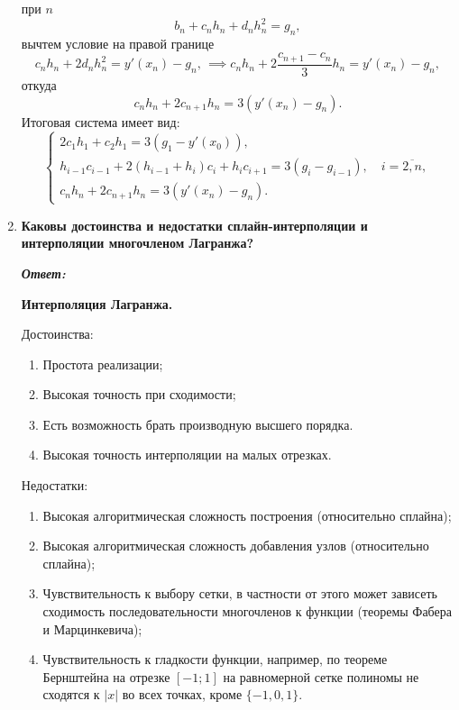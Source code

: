 \documentclass[12pt, a4paper]{article}
\newcommand{\abs}[1]{\lvert #1 \rvert}
\begin{document}
\begin{enumerate}
\[	\]
	при $n$
	\[
	b_n + c_n h_n + d_n h_n^2 = g_n,
	\]
	вычтем условие на правой границе
	\[
	c_n h_n + 2 d_n h_n^2 = y'(x_n) - g_n, \, \implies c_n h_n + 2 \frac{c_{n+1} - c_n}{3} h_n = y'(x_n) - g_n,
	\]
	откуда
	\[
	c_n h_n + 2 c_{n+1} h_n = 3(y'(x_n) - g_n).
	\]
	Итоговая система имеет вид:
	\begin{equation*}
		\begin{cases}
			2c_1 h_1 + c_2 h_1 = 3(g_1 - y'(x_0)), \\
			h_{i-1} c_{i-1} + 2 (h_{i -1} + h_i) c_i + h_i c_{i + 1} = 3(g_i - g_{i -1}), \quad i = \overline{2,n}, \\
			c_n h_n + 2 c_{n+1} h_n = 3(y'(x_n) - g_n).
		\end{cases}
	\end{equation*}
	
	\item \textbf{Каковы достоинства и недостатки сплайн-интерполяции и интерполяции многочленом Лагранжа?}
	\vspace*{0.2cm}
	
	\textit{\textbf{Ответ:}}
	
	\textbf{Интерполяция Лагранжа.}
	
	Достоинства:
	\begin{enumerate}
		\item Простота реализации;
		\item Высокая точность при сходимости;
		\item Есть возможность брать производную высшего порядка.
		\item Высокая точность интерполяции на малых отрезках.
	\end{enumerate}
	
	Недостатки:
	\begin{enumerate}
		\item Высокая алгоритмическая сложность построения (относительно сплайна);
		\item Высокая алгоритмическая сложность добавления узлов (относительно сплайна);
		\item Чувствительность к выбору сетки, в частности от этого может зависеть сходимость последовательности многочленов к функции (теоремы Фабера и Марцинкевича);
		\item Чувствительность к гладкости функции, например, по теореме Бернштейна на отрезке $[-1; 1]$ на равномерной сетке полиномы не сходятся к $\abs{x}$ во всех точках, кроме $\{-1, 0, 1\}$.
		 
	\end{enumerate}
	

\end{enumerate}
\end{document}
